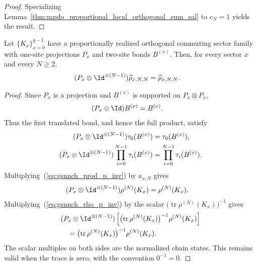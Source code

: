 \begin{proof}\leanok
    Specializing
    Lemma~\ref{thm:mpdo_proportional_local_orthogonal_sum_sal} to $c_N=1$
    yields the result.
\end{proof}

\begin{lemma}
    \label{thm:mpdo_proportional_orthogonal_commuting_sector_normalized_support}
    \leanok
    Let $\{K_x\}_{x=0}^{g-1}$ have a proportionally realized orthogonal
    commuting sector family with one-site projections $P_x$ and two-site
    bonds $B^{(x)}$. Then, for every sector $x$ and every $N\geq2$,
    \begin{align}
        (P_x\otimes\Id^{\otimes(N-1)})\widehat\rho_{x,N,N}
         & =\widehat\rho_{x,N,N}.
        \notag
    \end{align}
\end{lemma}

\begin{proof}\leanok
    Since $P_x$ is a projection and $B^{(x)}$ is supported on
    $P_x\otimes P_x$,
    \begin{align}
        (P_x\otimes\Id)B^{(x)}
         & =B^{(x)}.
        \notag
    \end{align}
    Thus the first translated bond, and hence the full product, satisfy
    \begin{align}
        (P_x\otimes\Id^{\otimes(N-1)})\tau_0(B^{(x)})
         & =\tau_0(B^{(x)}),
        \notag                                \\
        (P_x\otimes\Id^{\otimes(N-1)})
        \prod_{i=0}^{N-1}\tau_i(B^{(x)})
         & =\prod_{i=0}^{N-1}\tau_i(B^{(x)}).
        \label{eq:gsnnch_prod_p_inv}
    \end{align}
    Multiplying~(\ref{eq:gsnnch_prod_p_inv}) by $a_{x,N}$ gives
    \begin{align}
        (P_x\otimes\Id^{\otimes(N-1)})\rho^{(N)}(K_x)
         & =\rho^{(N)}(K_x).
        \label{eq:gsnnch_rho_p_inv}
    \end{align}
    Multiplying~(\ref{eq:gsnnch_rho_p_inv}) by the scalar
    $\bigl(\operatorname{tr}\rho^{(N)}(K_x)\bigr)^{-1}$ gives
    \begin{align}
         & (P_x\otimes\Id^{\otimes(N-1)})
        \left[
            \bigl(\operatorname{tr}\rho^{(N)}(K_x)\bigr)^{-1}
            \rho^{(N)}(K_x)
            \right]
        \notag                            \\
         & \quad=
        \bigl(\operatorname{tr}\rho^{(N)}(K_x)\bigr)^{-1}
        \rho^{(N)}(K_x).
        \notag
    \end{align}
    The scalar multiples on both sides are the normalized chain states. This
    remains valid when the trace is zero, with the convention $0^{-1}=0$.
\end{proof}

